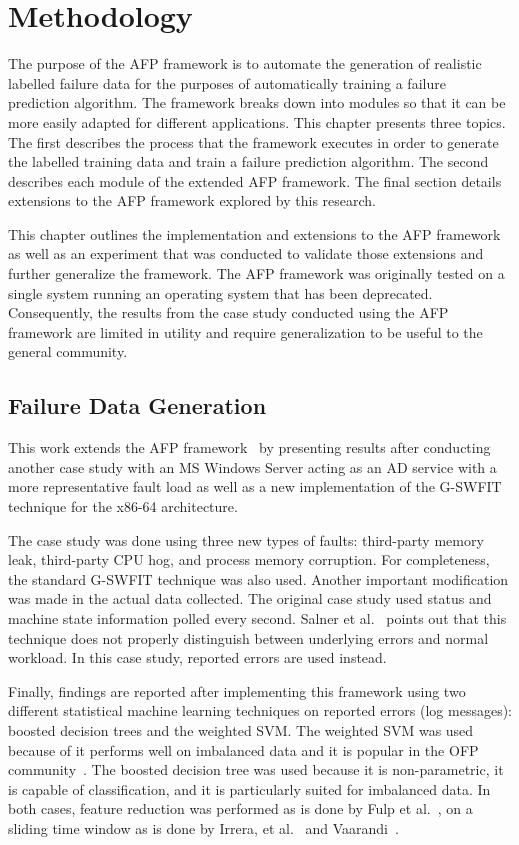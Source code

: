 \section{Methodology} \label{chapter3}
The purpose of the \ac{AFP} framework is to automate the generation of
realistic labelled failure data for the purposes of automatically training a
failure prediction algorithm.  The framework breaks down into modules so that
it can be more easily adapted for different applications.  This chapter
presents three topics.  The first describes the process that the framework
executes in order to generate the labelled training data and train a failure
prediction algorithm.  The second describes each module of the extended
\ac{AFP} framework.  The final section details extensions to the \ac{AFP}
framework explored by this research.

This chapter outlines the implementation and extensions to the \ac{AFP}
framework~\cite{irrera2015} as well as an experiment that was conducted to
validate those extensions and further generalize the framework.  The \ac{AFP}
framework was originally tested on a single system running an operating system
that has been deprecated.  Consequently, the results from the case study
conducted using the \ac{AFP} framework are limited in utility and require
generalization to be useful to the general community.

\subsection{Failure Data Generation} \label{sec:generation}
This work extends the \ac{AFP} framework~\cite{irrera2015} by presenting
results after conducting another case study with an \ac{MS} Windows Server
acting as an \ac{AD} service with a more representative fault load as well as a
new implementation of the \ac{G-SWFIT} technique for the x86-64 architecture.

The case study was done using three new types of faults: third-party memory
leak, third-party \ac{CPU} hog, and process memory corruption.  For
completeness, the standard \ac{G-SWFIT} technique was also used.  Another
important modification was made in the actual data collected.  The original
case study used status and machine state information polled every second.
Salner et al.~\cite{salfnerSurvey} points out that this technique does not
properly distinguish between underlying errors and normal workload.  In this
case study, reported errors are used instead.

Finally, findings are reported after implementing this framework using two
different statistical machine learning techniques on reported errors (log
messages): boosted decision trees and the weighted \ac{SVM}.  The weighted
\ac{SVM} was used because of it performs well on imbalanced data and it is
popular in the \ac{OFP} community~\cite{salfnerSurvey}.  The boosted decision
tree was used because it is non-parametric, it is capable of classification,
and it is particularly suited for imbalanced data.  In both cases, feature
reduction was performed as is done by Fulp et al.~\cite{fulp2008}, on a sliding
time window as is done by Irrera, et al.~\cite{irrera2013a} and
Vaarandi~\cite{vaarandi2002}.

